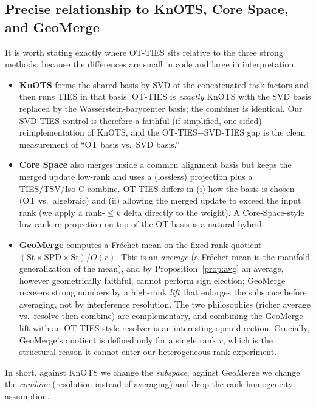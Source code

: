 \documentclass[11pt]{article}
\newcommand{\otties}{\textsc{OT-TIES}}
\newcommand{\svdties}{\textsc{SVD-TIES}}
\begin{document}
\subsection{Precise relationship to KnOTS, Core Space, and GeoMerge}
\label{sec:method-compare}
It is worth stating exactly where \otties{} sits relative to the three strong methods, because the
differences are small in code and large in interpretation.
\begin{itemize}[leftmargin=1.4em,itemsep=3pt]
\item \textbf{KnOTS} \citep{stoica2024knots} forms the shared basis by SVD of the concatenated task
factors and then runs TIES in that basis. \otties{} is \emph{exactly} KnOTS with the SVD basis replaced
by the Wasserstein-barycenter basis; the combiner is identical. Our \svdties{} control is therefore a
faithful (if simplified, one-sided) reimplementation of KnOTS, and the \otties{}$-$\svdties{} gap is the
clean measurement of ``OT basis vs.\ SVD basis.''
\item \textbf{Core Space} \citep{panariello2025corespace} also merges inside a common alignment basis but
keeps the merged update low-rank and uses a (lossless) projection plus a TIES/TSV/Iso-C combine. \otties{}
differs in (i) how the basis is chosen (OT vs.\ algebraic) and (ii) allowing the merged update to exceed
the input rank (we apply a rank-$\le k$ delta directly to the weight). A Core-Space-style low-rank
re-projection on top of the OT basis is a natural hybrid.
\item \textbf{GeoMerge} \citep{dasilva2026geomerge} computes a Fr\'echet mean on the fixed-rank quotient
$(\mathrm{St}\times\mathrm{SPD}\times\mathrm{St})/O(r)$. This is an \emph{average} (a Fr\'echet mean is the
manifold generalization of the mean), and by Proposition~\ref{prop:avg} an average, however
geometrically faithful, cannot perform sign election; GeoMerge recovers strong numbers by a high-rank
\emph{lift} that enlarges the subspace before averaging, not by interference resolution. The two
philosophies (richer average vs.\ resolve-then-combine) are complementary, and combining the GeoMerge lift
with an \otties{}-style resolver is an interesting open direction. Crucially, GeoMerge's quotient is
defined only for a single rank $r$, which is the structural reason it cannot enter our heterogeneous-rank
experiment.
\end{itemize}
In short, against KnOTS we change the \emph{subspace}; against GeoMerge we change the \emph{combine}
(resolution instead of averaging) and drop the rank-homogeneity assumption.
\end{document}
